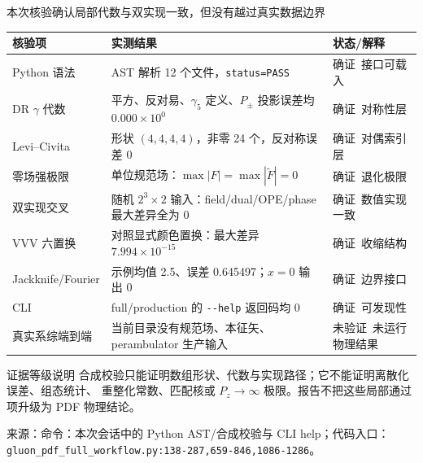 \documentclass[UTF8,aspectratio=169,11pt]{ctexbeamer}
\newcommand{\source}[1]{%
  \vspace{0.06em}\par{\raggedright\scriptsize\color{muted}来源：#1\par}}
\newcommand{\verified}{\textcolor{evidence}{确证}}
\newcommand{\unverified}{\textcolor{warning}{未验证}}
\newcommand{\codepath}[1]{\nolinkurl{#1}}
\begin{document}
\begin{frame}[t]{本次核验确认局部代数与双实现一致，但没有越过真实数据边界}
  \centering
  \scriptsize
  \begin{tabularx}{0.96\textwidth}{@{}lYl@{}}
    \toprule
    核验项 & 实测结果 & 状态/解释 \\
    \midrule
    Python 语法 & AST 解析 12 个文件，\codepath{status=PASS} & \verified\ 接口可载入 \\
    DR \(\gamma\) 代数 & 平方、反对易、\(\gamma_5\) 定义、\(P_\pm\) 投影误差均 \(0.000\times10^0\) & \verified\ 对称性层 \\
    Levi–Civita & 形状 \((4,4,4,4)\)，非零 24 个，反对称误差 0 & \verified\ 对偶索引层 \\
    零场强极限 & 单位规范场：\(\max|F|=\max|\widetilde F|=0\) & \verified\ 退化极限 \\
    双实现交叉 & 随机 \(2^3\times2\) 输入：field/dual/OPE/phase 最大差异全为 0 & \verified\ 数值实现一致 \\
    VVV 六置换 & 对照显式颜色置换：最大差异 \(7.994\times10^{-15}\) & \verified\ 收缩结构 \\
    Jackknife/Fourier & 示例均值 2.5、误差 0.645497；\(x=0\) 输出 0 & \verified\ 边界接口 \\
    CLI & full/production 的 \codepath{--help} 返回码均 0 & \verified\ 可发现性 \\
    真实系综端到端 & 当前目录没有规范场、本征矢、perambulator 生产输入 & \unverified\ 未运行物理结果 \\
    \bottomrule
  \end{tabularx}
  \vspace{0.18cm}
  \begin{block}{证据等级说明}
    合成校验只能证明数组形状、代数与实现路径；它不能证明离散化误差、组态统计、
    重整化常数、匹配核或 \(P_z\to\infty\) 极限。报告不把这些局部通过项升级为 PDF 物理结论。
  \end{block}
  \source{命令：本次会话中的 Python AST/合成校验与 CLI help；代码入口：\codepath{gluon_pdf_full_workflow.py:138-287,659-846,1086-1286}。}
\end{frame}
\end{document}
